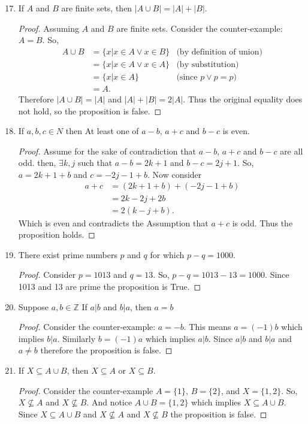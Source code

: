 \documentclass{article}
\newcommand{\Z}{\mathbb{Z}}
\newcommand{\nitem}[1] %
{
	\setcounter{enumi}{#1}
	\addtocounter{enumi}{-1}
	\item
}
\begin{document}
\begin{enumerate}
		\nitem{16} If $A$ and $B$ are finite sets, then $|A \cup B| = |A|+|B|$.
		\begin{proof}
			Assuming $A$ and $B$ are finite sets. Consider the counter-example: $A=B$. 
			So, 
			\begin{align*}
				A \cup B &= \{x| x \in A \vee x \in B \} & \text{(by definition of union)}\\
				&= \{x| x \in A \vee x \in A \} & \text{(by substitution)}\\
				&= \{x| x \in A\} 					& \text{(since } p \vee p = p) \\
				&= A.
			\end{align*}
			Therefore $|A \cup B| = |A|$ and $|A|+|B| = 2|A|$. Thus the original equality does not hold, so the proposition is false.
		\end{proof}
		
		\nitem{18} If $a, b, c \in N$ then At least one of $a-b$, $a+c$ and $b-c$ is even.
		\begin{proof} 
			Assume for the sake of contradiction that $a-b$, $a+c$ and $b-c$ are all odd.
			then, $\exists k, j $ such that $a-b= 2k+1$ and $b-c= 2j+1$.
			So, $a = 2k +1+b$ and $c= -2j-1+ b$. Now consider 
			\begin{align*}
				a + c &= (2k +1+b) + (-2j-1+ b)\\
				&= 2k -2j +2b\\
				&= 2(k-j+b).
			\end{align*}
			Which is even and contradicts the Assumption that $a+c$ is odd. Thus the proposition holds.
		\end{proof}
		
		\nitem{20} There exist prime numbers $p$ and $q$ for which $p - q = 1000$.
		\begin{proof}
			Consider $p = 1013$ and $q = 13$. So, $p-q = 1013-13 = 1000$.  Since 1013 and 13 are prime the proposition is True.
		\end{proof}
		
		\nitem{28} Suppose $a,b \in \Z$ If $a|b$ and $b|a$, then $a = b$
		\begin{proof} Consider the counter-example: $a = -b$. This means $a = (-1)b$ which implies $b|a$. Similarly $b = (-1)a$ which implies $a|b$. Since $a|b$ and $b|a$ and $a \neq b$ therefore the proposition is false.
			
		\end{proof}
		
		\nitem{34} If $X \subseteq A \cup B$, then $X \subseteq A$ or $X \subseteq B$.
		\begin{proof}
			Consider the counter-example $A =\{1\}$, $B =\{2\}$, and $X=\{1, 2\}$. 
			So, $X \not\subseteq A$ and $X \not\subseteq B$.
			And notice $A \cup B = \{1, 2\}$ which implies $X \subseteq A \cup B$.
			Since $X \subseteq A \cup B$ and $X \not\subseteq A$ and $X \not\subseteq B$ the proposition is false. 
		\end{proof}
		
	\end{enumerate}
	
\end{document}
